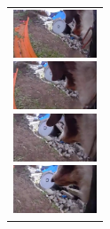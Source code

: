 \begin{figure}[H]
    \begin{tabular}{l}

\\ %

      \begin{minipage}{0.165\hsize}
        \begin{center}
          \includegraphics[clip, width=2.5cm]{./Figures/still_commandmatemate1.eps}
        \end{center}
      \end{minipage}
      \begin{minipage}{0.165\hsize}
        \begin{center}
          \includegraphics[clip, width=2.5cm]{./Figures/still_commandmatemate2.eps}
        \end{center}
      \end{minipage}
      \begin{minipage}{0.165\hsize}
        \begin{center}
          \includegraphics[clip, width=2.5cm]{./Figures/still_commandmatemate3.eps}
        \end{center}
      \end{minipage}
      \begin{minipage}{0.165\hsize}
        \begin{center}
          \includegraphics[clip, width=2.5cm]{./Figures/still_commandmatemate4.eps}
        \end{center}
      \end{minipage}
      \begin{minipage}{0.165\hsize}
        \begin{center}

\end{center}
\end{minipage}
\end{tabular}
\end{figure}
